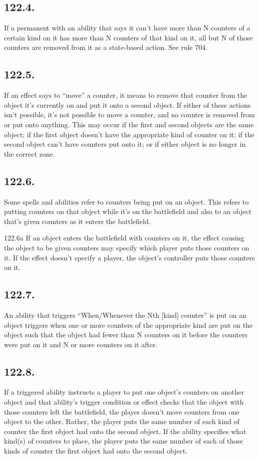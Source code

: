 \subsection*{122.4.}
If a permanent with an ability that says it can’t have more than N counters of a certain kind on it has more than N counters of that kind on it, all but N of those counters are removed from it as a state-based action. See rule 704.

\subsection*{122.5.}
If an effect says to “move” a counter, it means to remove that counter from the object it’s currently on and put it onto a second object. If either of these actions isn’t possible, it’s not possible to move a counter, and no counter is removed from or put onto anything. This may occur if the first and second objects are the same object; if the first object doesn’t have the appropriate kind of counter on it; if the second object can’t have counters put onto it; or if either object is no longer in the correct zone.

\subsection*{122.6.}
Some spells and abilities refer to counters being put on an object. This refers to putting counters on that object while it’s on the battlefield and also to an object that’s given counters as it enters the battlefield.

122.6a If an object enters the battlefield with counters on it, the effect causing the object to be given counters may specify which player puts those counters on it. If the effect doesn’t specify a player, the object’s controller puts those counters on it.

\subsection*{122.7.}
An ability that triggers “When/Whenever the Nth [kind] counter” is put on an object triggers when one or more counters of the appropriate kind are put on the object such that the object had fewer than N counters on it before the counters were put on it and N or more counters on it after.

\subsection*{122.8.}
If a triggered ability instructs a player to put one object’s counters on another object and that ability’s trigger condition or effect checks that the object with those counters left the battlefield, the player doesn’t move counters from one object to the other. Rather, the player puts the same number of each kind of counter the first object had onto the second object. If the ability specifies what kind(s) of counters to place, the player puts the same number of each of those kinds of counter the first object had onto the second object.

